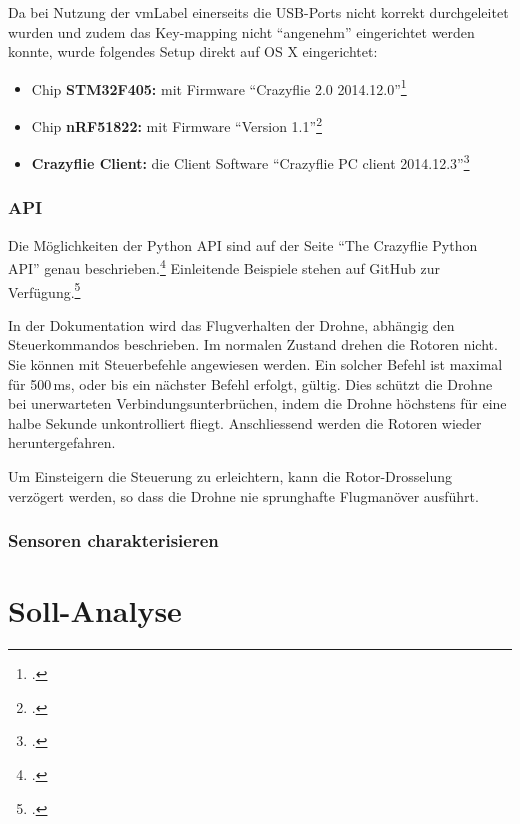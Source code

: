 Da bei Nutzung der \gls{vmLabel} einerseits die USB-Ports nicht korrekt durchgeleitet wurden und zudem das Key-mapping nicht "`angenehm"' eingerichtet werden konnte, wurde folgendes Setup direkt auf OS X eingerichtet:
\begin{itemize}
	\item Chip \textbf{STM32F405:} mit Firmware "`Crazyflie 2.0 2014.12.0"'\footcite{bitcraze_crazyflie-firmware_2015-03-30}
	\item Chip \textbf{nRF51822:} mit Firmware "`Version 1.1"'\footcite{bitcraze_crazyflie2-nrf-firmware_2015-03-30}
	\item \textbf{Crazyflie Client:} die Client Software "`Crazyflie PC client 2014.12.3"'\footcite{bitcraze_crazyflie-clients-python_2015-03-30}
\end{itemize}


\subsubsection{API}
\label{subsubsec:droneApi}
Die Möglichkeiten der Python API sind auf der Seite "`The Crazyflie Python API"' genau beschrieben.\footcite{doc_crazyflie_api_python_index_Bitcraze_Wiki_2015-03-30}
Einleitende Beispiele stehen auf GitHub zur Verfügung.\footcite{crazyflie-clients-python_examples_crazyflie-clients-python_2015-03-30}

In der Dokumentation wird das Flugverhalten der Drohne, abhängig den Steuerkommandos beschrieben.
Im normalen Zustand drehen die Rotoren nicht.
Sie können mit Steuerbefehle angewiesen werden.
Ein solcher Befehl ist maximal für 500\,ms, oder bis ein nächster Befehl erfolgt, gültig.
Dies schützt die Drohne bei unerwarteten Verbindungsunterbrüchen, indem die Drohne höchstens für eine halbe Sekunde unkontrolliert fliegt.
Anschliessend werden die Rotoren wieder heruntergefahren.

Um Einsteigern die Steuerung zu erleichtern, kann die Rotor-Drosselung verzögert werden, so dass die Drohne nie sprunghafte Flugmanöver ausführt.


\subsubsection{Sensoren charakterisieren}


\section{Soll-Analyse}

